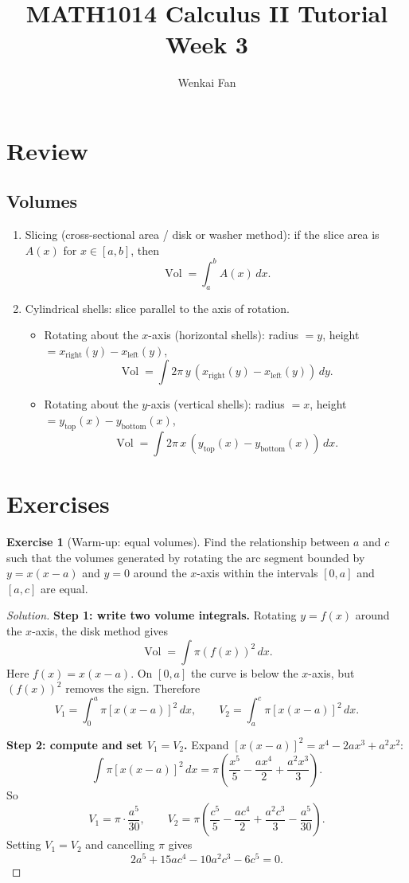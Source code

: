 \documentclass[11pt]{article}
\title{\vspace{-1.0em}MATH1014 Calculus II Tutorial\\Week 3}
\author{Wenkai Fan}
\date{}
\theoremstyle{definition}
\newtheorem{exercise}{Exercise}[section]
\newenvironment{solution}{\begin{proof}[Solution]}{\end{proof}}
\DeclareMathOperator{\Vol}{Vol}
\begin{document}
\maketitle
\thispagestyle{fancy}

\section{Review}

\subsection{Volumes}
\begin{enumerate}
  \item Slicing (cross-sectional area / disk or washer method): if the slice area is $A(x)$ for $x\in[a,b]$, then
  \[
  \Vol=\int_a^b A(x)\,dx.
  \]
  \item Cylindrical shells: slice parallel to the axis of rotation.
  \begin{itemize}
    \item Rotating about the $x$-axis (horizontal shells): radius $=y$, height $=x_{\text{right}}(y)-x_{\text{left}}(y)$,
    \[
    \Vol=\int 2\pi\,y\,(x_{\text{right}}(y)-x_{\text{left}}(y))\,dy.
    \]
    \item Rotating about the $y$-axis (vertical shells): radius $=x$, height $=y_{\text{top}}(x)-y_{\text{bottom}}(x)$,
    \[
    \Vol=\int 2\pi\,x\,(y_{\text{top}}(x)-y_{\text{bottom}}(x))\,dx.
    \]
  \end{itemize}
\end{enumerate}

\section{Exercises}

\begin{exercise}[Warm-up: equal volumes]
Find the relationship between $a$ and $c$ such that the volumes generated by rotating the arc segment bounded by $y=x(x-a)$ and $y=0$ around the $x$-axis within the intervals $[0,a]$ and $[a,c]$ are equal.
\end{exercise}

\begin{solution}
\textbf{Step 1: write two volume integrals.} Rotating $y=f(x)$ around the $x$-axis, the disk method gives
\[
\Vol=\int \pi (f(x))^{2}\,dx.
\]
Here $f(x)=x(x-a)$. On $[0,a]$ the curve is below the $x$-axis, but $(f(x))^{2}$ removes the sign. Therefore
\[
V_{1}=\int_{0}^{a}\pi[x(x-a)]^{2}\,dx,\qquad
V_{2}=\int_{a}^{c}\pi[x(x-a)]^{2}\,dx.
\]

\textbf{Step 2: compute and set $V_{1}=V_{2}$.} Expand $[x(x-a)]^{2}=x^{4}-2ax^{3}+a^{2}x^{2}$:
\[
\int \pi[x(x-a)]^{2}\,dx
=\pi\left(\frac{x^{5}}{5}-\frac{a x^{4}}{2}+\frac{a^{2}x^{3}}{3}\right).
\]
So
\[
V_{1}=\pi\cdot\frac{a^{5}}{30},\qquad
V_{2}=\pi\left(\frac{c^{5}}{5}-\frac{a c^{4}}{2}+\frac{a^{2}c^{3}}{3}-\frac{a^{5}}{30}\right).
\]
Setting $V_{1}=V_{2}$ and cancelling $\pi$ gives
\[
2a^{5}+15ac^{4}-10a^{2}c^{3}-6c^{5}=0.
\]
\end{solution}
\end{document}
